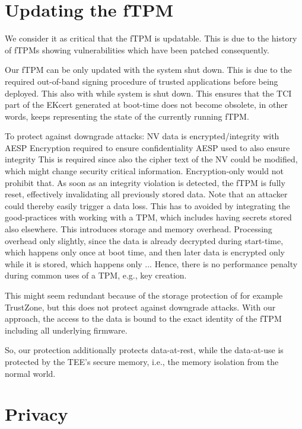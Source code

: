 \section{Updating the fTPM}

We consider it as critical that the \ac{fTPM} is updatable. This is due to the history of \acp{fTPM} showing vulnerabilities which have been patched consequently. %

Our \ac{fTPM} can be only updated with the system shut down. This is due to the required out-of-band signing procedure of trusted applications before being deployed. This also  with while system is shut down. This ensures that the TCI part of the EKcert generated at boot-time does not become obsolete, in other words, keeps representing the state of the currently running fTPM.


To protect against downgrade attacks:
NV data is encrypted/integrity with AESP
Encryption required to ensure confidentiality
AESP used to also ensure integrity
This is required since also the cipher text of the NV could be modified, which might change security critical information.
Encryption-only would not prohibit that.
As soon as an integrity violation is detected, the \ac{fTPM} is fully reset, effectively invalidating all previously stored data.
Note that an attacker could thereby easily trigger a data loss.
This has to avoided by integrating the good-practices with working with a \ac{TPM}, which includes having secrets stored also elsewhere. %
This introduces storage and memory overhead.
Processing overhead only slightly, since the data is already decrypted during start-time, which happens only once at boot time, and then later data is encrypted only while it is stored, which happens only ... %
Hence, there is no performance penalty during common uses of a \ac{TPM}, e.g., key creation.

This might seem redundant because of the storage protection of for example TrustZone, but this does not protect against downgrade attacks. With our approach, the access to the data is bound to the exact identity of the fTPM including all underlying firmware.

So, our protection additionally protects data-at-rest, while the data-at-use is protected by the TEE's secure memory, i.e., the memory isolation from the normal world.



\section{Privacy}

